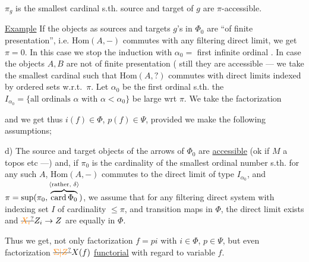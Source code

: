 
$\pi_g$ is the smallest cardinal s.th. source and target of $g$ are $\pi$-accessible.

\uline{Example} If the objects  as sources and targets  $g$'s in $\Phi_0$ are ``of finite presentation'', i.e. $\mathrm{Hom}(A,-)$ commutes with any filtering direct limit, we get $\pi=0$. In this case we stop the induction with $\alpha_0=$ first infinite ordinal \inserted{$\omega$} . In case the objects $A,B$ are not of finite presentation ( still they are accessible --- we take the smallest cardinal such that $\mathrm{Hom}(A,?)$ commutes with direct limits indexed by  ordered sets   w.r.t.\ $\pi$. Let  $\alpha_0$ be the first ordinal s.th. the  $I_{\alpha_0}=\{\text{all ordinals }\alpha\text{ with }\alpha<\alpha_0\}$ be  large wrt $\pi$. We take the factorization

and we get thus $i(f)\in\Phi$, $p(f)\in\Psi$, provided we make the following assumptions;

d) The  source and target objects of the arrows of $\Phi_0$ are \uline{accessible} (ok if $M$ a topos etc ---) and, if $\pi_0$ is the cardinality of the smallest ordinal number  s.th. for any such $A$, $\mathrm{Hom}(A,-)$ commutes to the  direct limit of type $I_{\alpha_0}$,  and \deleted{$\pi=\sup(\pi$} $\pi=\sup(\pi_0,\overset{\inserted{\text{rather, }\delta}}{\overbrace{\mathrm{card}\,\Phi_0}})$, we assume that for any filtering direct system with indexing set $I$ of cardinality $\leq\pi$, and transition maps in $\Phi$, the direct limit exists and $\deleted{\unsure{X_i}} Z_i\to Z$ are equally in $\Phi$.

Thus we get, not only factorization $f=pi$ with $i\in\Phi$, $p\in\Psi$, but even factorization $\deleted{\unsure{\Sigma|Z}}X(f)$ \uline{functorial} with regard to variable $f$.
